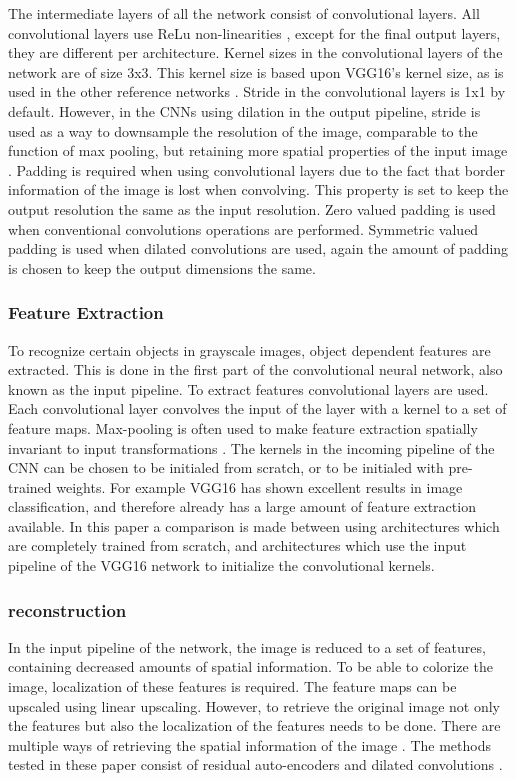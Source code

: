The intermediate layers of all the network consist of convolutional layers. All convolutional layers use ReLu non-linearities \cite{nair2010rectified}, except for the final output layers, they are different per architecture. 
Kernel sizes in the convolutional layers of the network are of size 3x3. This kernel size is based upon VGG16's \cite{Simonyan} kernel size, as is used in the other reference networks \cite{Dahl}\cite{Zhang} \cite{ioffe2015batch}.
Stride in the convolutional layers is 1x1 by default. However, in the CNNs using dilation in the output pipeline, stride is used as a way to downsample the resolution of the image, comparable to the function of max pooling, but retaining more spatial properties of the input image \cite{yu2015multi}. Padding is required when using convolutional layers due to the fact that border information of the image is lost when convolving. This property is set to keep the output resolution the same as the input resolution. Zero valued padding is used when conventional convolutions operations are performed. Symmetric valued padding is used when dilated convolutions are used, again the amount of padding is chosen to keep the output dimensions the same.\\


\subsubsection{Feature Extraction}
To recognize certain objects in grayscale images, object dependent features are extracted. This is done in the first part of the convolutional neural network, also known as the input pipeline. To extract features convolutional layers are used. Each convolutional layer convolves the input of the layer with a kernel to a set of feature maps. Max-pooling is often used to make feature extraction spatially invariant to input transformations \cite{Simonyan}. The kernels in the incoming pipeline of the CNN can be chosen to be initialed from scratch, or to be initialed with pre-trained weights. For example VGG16 \cite{Simonyan} has shown excellent results in image classification, and therefore already has a large amount of feature extraction available. In this paper a comparison is made between using architectures which are completely trained from scratch, and architectures which use the input pipeline of the VGG16 network to initialize the convolutional kernels.\\

\subsubsection{reconstruction}
In the input pipeline of the network, the image is reduced to a set of features, containing decreased amounts of spatial information. To be able to colorize the image, localization of these features is required. The feature maps can be upscaled using linear upscaling. However, to retrieve the original image not only the features but also the localization of the features needs to be done. There are multiple ways of retrieving the spatial information of the image \cite{Charpiat} \cite{Zhang}. The methods tested in these paper consist of residual auto-encoders and dilated convolutions \cite{yu2015multi}.

